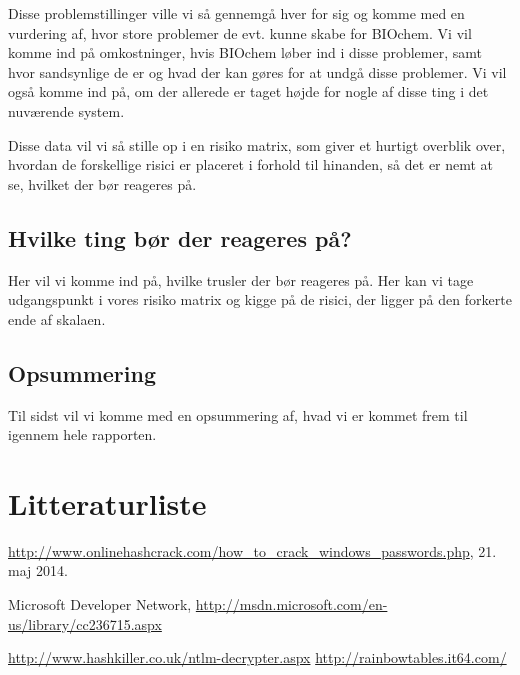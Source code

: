 \documentclass[10pt,a4paper,danish]{article}
\begin{document}
Disse problemstillinger ville vi så gennemgå hver for sig og komme med en
vurdering af, hvor store problemer de evt. kunne skabe for BIOchem.
Vi vil komme ind på omkostninger, hvis BIOchem løber ind i disse problemer,
samt hvor sandsynlige de er og hvad der kan gøres for at undgå disse problemer.
Vi vil også komme ind på, om der allerede er taget højde for nogle af disse ting
i det nuværende system.

Disse data vil vi så stille op i en risiko matrix, som giver et hurtigt overblik
over, hvordan de forskellige risici er placeret i forhold til hinanden, så det
er nemt at se, hvilket der bør reageres på.

\subsection{Hvilke ting bør der reageres på?}
Her vil vi komme ind på, hvilke trusler der bør reageres på. Her kan vi tage
udgangspunkt i vores risiko matrix og kigge på de risici, der ligger på den
forkerte ende af skalaen.

\subsection{Opsummering}
Til sidst vil vi komme med en opsummering af, hvad vi er kommet frem til igennem
hele rapporten.


\section{Litteraturliste}

\begin{thebibliography}{9}

  \url{http://www.onlinehashcrack.com/how_to_crack_windows_passwords.php}, 21.
  maj 2014.

 Microsoft Developer Network,
  \url{http://msdn.microsoft.com/en-us/library/cc236715.aspx}

 \url{http://www.hashkiller.co.uk/ntlm-decrypter.aspx}
 \url{http://rainbowtables.it64.com/}

\end{thebibliography}
\end{document}
